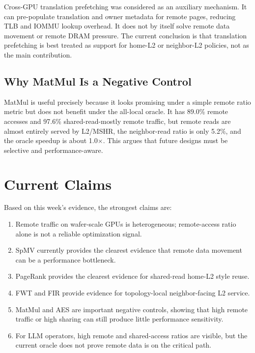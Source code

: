 \documentclass[sigconf,screen,review,anonymous]{acmart}
\begin{document}
Cross-GPU translation prefetching was considered as an auxiliary mechanism.  It
can pre-populate translation and owner metadata for remote pages, reducing TLB
and IOMMU lookup overhead.  It does not by itself solve remote data movement or
remote DRAM pressure.  The current conclusion is that translation prefetching is
best treated as support for home-L2 or neighbor-L2 policies, not as the main
contribution.

\subsection{Why MatMul Is a Negative Control}

MatMul is useful precisely because it looks promising under a simple remote
ratio metric but does not benefit under the all-local oracle.  It has 89.0\%
remote accesses and 97.6\% shared-read-mostly remote traffic, but remote reads
are almost entirely served by L2/MSHR, the neighbor-read ratio is only 5.2\%,
and the oracle speedup is about 1.0$\times$.  This argues that future designs
must be selective and performance-aware.

\section{Current Claims}

Based on this week's evidence, the strongest claims are:

\begin{enumerate}
  \item Remote traffic on wafer-scale GPUs is heterogeneous; remote-access ratio
  alone is not a reliable optimization signal.
  \item SpMV currently provides the clearest evidence that remote data movement
  can be a performance bottleneck.
  \item PageRank provides the clearest evidence for shared-read home-L2 style
  reuse.
  \item FWT and FIR provide evidence for topology-local neighbor-facing L2
  service.
  \item MatMul and AES are important negative controls, showing that high remote
  traffic or high sharing can still produce little performance sensitivity.
  \item For LLM operators, high remote and shared-access ratios are visible, but
  the current oracle does not prove remote data is on the critical path.
\end{enumerate}
\end{document}
